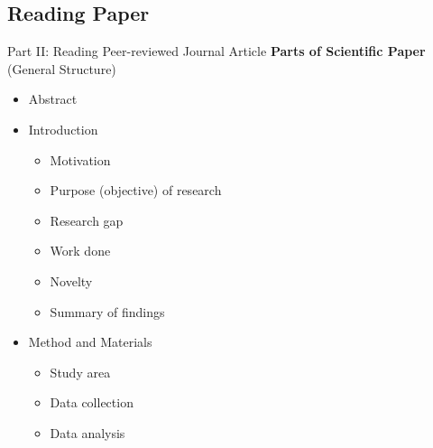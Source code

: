 \documentclass[11pt]{beamer}
\begin{document}
\subsection{Reading Paper}
\begin{frame}{Part II: Reading Peer-reviewed Journal Article}
    \textbf{Parts of Scientific Paper} (General Structure)
        \vspace{0.3cm}
        \begin{itemize}
            \item Abstract
            \vspace{0.1cm}
            \item Introduction
                \begin{itemize}
                    \item Motivation
                    \item Purpose (objective) of research
                    \item Research gap
                    \item Work done
                    \item Novelty
                    \item Summary of findings
                \end{itemize}
                \vspace{0.1cm}
            \item Method and Materials
                \begin{itemize}
                    \item Study area
                    \item Data collection
                    \item Data analysis
                \end{itemize}
        \end{itemize}
\end{frame}
\end{document}
